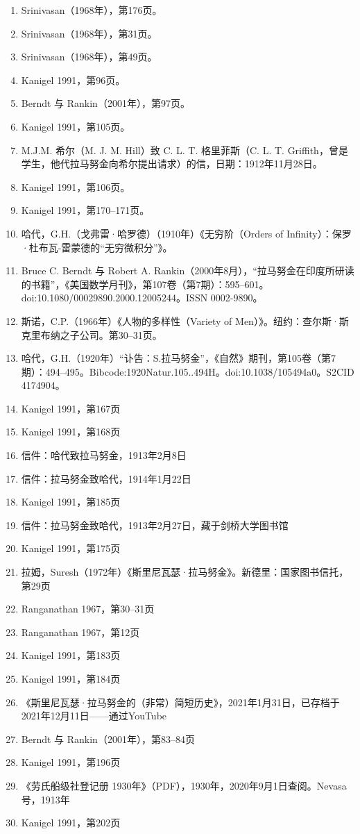 \begin{enumerate}
\item Srinivasan（1968年），第176页。
\item Srinivasan（1968年），第31页。
\item Srinivasan（1968年），第49页。
\item Kanigel 1991，第96页。
\item Berndt 与 Rankin（2001年），第97页。
\item Kanigel 1991，第105页。
\item M.J.M. 希尔（M. J. M. Hill）致 C. L. T. 格里菲斯（C. L. T. Griffith，曾是学生，他代拉马努金向希尔提出请求）的信，日期：1912年11月28日。
\item Kanigel 1991，第106页。
\item Kanigel 1991，第170–171页。
\item 哈代，G.H.（戈弗雷·哈罗德）（1910年）《无穷阶（Orders of Infinity）：保罗·杜布瓦-雷蒙德的“无穷微积分”》。
\item Bruce C. Berndt 与 Robert A. Rankin（2000年8月），“拉马努金在印度所研读的书籍”，《美国数学月刊》，第107卷（第7期）：595–601。doi:10.1080/00029890.2000.12005244。ISSN 0002-9890。
\item 斯诺，C.P.（1966年）《人物的多样性（Variety of Men）》。纽约：查尔斯·斯克里布纳之子公司。第30–31页。
\item 哈代，G.H.（1920年）“讣告：S.拉马努金”，《自然》期刊，第105卷（第7期）：494–495。Bibcode:1920Natur.105..494H。doi:10.1038/105494a0。S2CID 4174904。
\item Kanigel 1991，第167页
\item Kanigel 1991，第168页
\item 信件：哈代致拉马努金，1913年2月8日
\item 信件：拉马努金致哈代，1914年1月22日
\item Kanigel 1991，第185页
\item 信件：拉马努金致哈代，1913年2月27日，藏于剑桥大学图书馆
\item Kanigel 1991，第175页
\item 拉姆，Suresh（1972年）《斯里尼瓦瑟·拉马努金》。新德里：国家图书信托，第29页
\item Ranganathan 1967，第30–31页
\item Ranganathan 1967，第12页
\item Kanigel 1991，第183页
\item Kanigel 1991，第184页
\item 《斯里尼瓦瑟·拉马努金的（非常）简短历史》，2021年1月31日，已存档于2021年12月11日——通过YouTube
\item Berndt 与 Rankin（2001年），第83–84页
\item Kanigel 1991，第196页
\item 《劳氏船级社登记册 1930年》（PDF），1930年，2020年9月1日查阅。Nevasa号，1913年
\item Kanigel 1991，第202页
\end{enumerate}